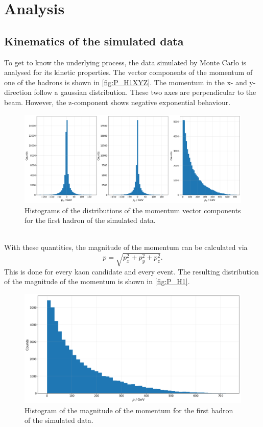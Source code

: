 \section{Analysis}
\label{sec:Analysis}

\subsection{Kinematics of the simulated data}
\label{sec:simdata}
To get to know the underlying process, the data simulated by Monte Carlo is analysed for its kinetic properties. The vector components of the momentum
of one of the hadrons is shown in \autoref{fig:P_H1XYZ}. The momentum in the x- and y- direction follow a gaussian distribution. These two axes are perpendicular
to the beam. However, the z-component shows negative exponential behaviour.
\begin{figure}
  \centering
  \includegraphics[width = .95\textwidth]{"content/pics/P_H1XYZ.png"}

  \caption{Histograms of the distributions of the momentum vector components for the first hadron of the simulated data.}
  \label{fig:P_H1XYZ}
\end{figure}
\\ With these quantities, the magnitude of the momentum can be calculated via 
\begin{equation}
  \label{eq:magn_p}
    p = \sqrt{p_x^2 + p_y^2 + p_z^2}.
\end{equation}
This is done for every kaon candidate and every event.
The resulting distribution of the magnitude of the momentum is shown in \autoref{fig:P_H1}.
\begin{figure}
  \centering
  \includegraphics[width = .7\textwidth]{"content/pics/P_H1.png"}
  \caption{Histogram of the magnitude of the momentum for the first hadron of the simulated data.}
  \label{fig:P_H1}
\end{figure}
